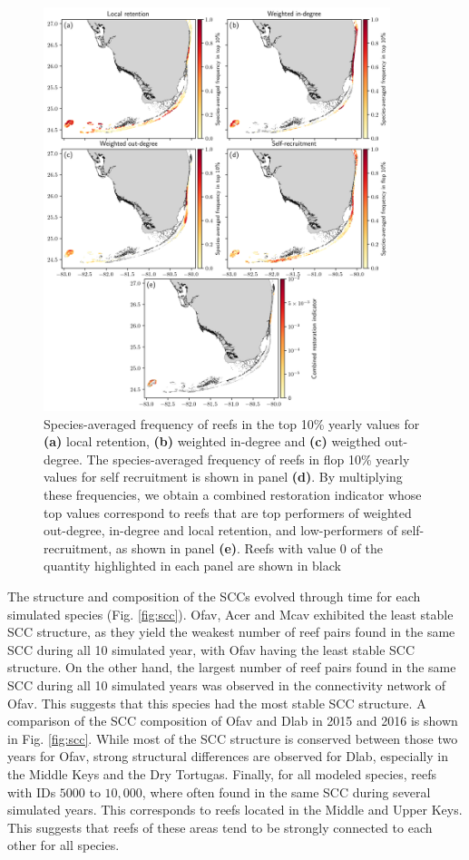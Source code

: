 \documentclass[preprint,12pt,authoryear]{elsarticle}
\begin{document}
\begin{figure}
   \centering
   \includegraphics[width=0.9\textwidth]{figures/fig_top10.png}
   \caption{Species-averaged frequency of reefs in the top 10\% yearly values for \textbf{(a)} local retention, \textbf{(b)} weighted in-degree and \textbf{(c)} weigthed out-degree. The species-averaged frequency of reefs in flop 10\% yearly values for self recruitment is shown in panel \textbf{(d)}. By multiplying these frequencies, we obtain a combined restoration indicator whose top values correspond to reefs that are top performers of weighted out-degree, in-degree and local retention, and low-performers of self-recruitment, as shown in panel \textbf{(e)}. Reefs with value 0 of the quantity highlighted in each panel are shown in black}\label{fig:top10}
\end{figure}

The structure and composition of the SCCs evolved through time for each simulated species (Fig. \ref{fig:scc}). Ofav, Acer and Mcav exhibited the least stable SCC structure, as they yield the weakest number of reef pairs found in the same SCC during all 10 simulated year, with Ofav having the least stable SCC structure. On the other hand, the largest number of reef pairs found in the same SCC during all 10 simulated years was observed in the connectivity network of Ofav. This suggests that this species had the most stable SCC structure. A comparison of the SCC composition of Ofav and Dlab in 2015 and 2016 is shown in Fig. \ref{fig:scc}. While most of the SCC structure is conserved between those two years for Ofav, strong structural differences are observed for Dlab, especially in the Middle Keys and the Dry Tortugas. Finally, for all modeled species, reefs with IDs $5000$ to $10,000$, where often found in the same SCC during several simulated years. This corresponds to reefs located in the Middle and Upper Keys. This suggests that reefs of these areas tend to be strongly connected to each other for all species.
\end{document}
